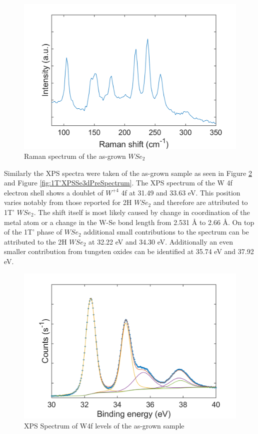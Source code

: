 \begin{figure}[!h]
	\begin{center}
		\includegraphics[scale=0.3]{1T'/RamanSpectrumPre.png}
		\caption{Raman spectrum of the as-grown $WSe_2$}
		\label{fig:1T'RamanSpectrumPre}
	\end{center}
\end{figure}

Similarly the XPS spectra were taken of the as-grown sample as seen in Figure \ref{fig:1T'XPSW4fPreSpectrum} and Figure \ref{fig:1T'XPSSe3dPreSpectrum}. The XPS spectrum of the W 4f electron shell shows a doublet of $W^{+4}$ 4f at 31.49 and 33.63 eV. This position varies notably from those reported for 2H $WSe_2$ and therefore are attributed to 1T' $WSe_2$. The shift itself is most likely caused by change in coordination of the metal atom or a change in the W-Se bond length from 2.531 \r{A} to 2.66 \r{A}. On top of the 1T' phase of $WSe_2$ additional small contributions to the spectrum can be attributed to the 2H $WSe_2$ at 32.22 eV and 34.30 eV. Additionally an even smaller contribution from tungsten oxides can be identified at 35.74 eV and 37.92 eV.

\begin{figure}[!h]
	\begin{center}
		\includegraphics[scale=0.3]{1T'/XPSW4fPre.png}
		\caption{XPS Spectrum of W4f levels of the as-grown sample}
		\label{fig:1T'XPSW4fPreSpectrum}
	\end{center}
\end{figure}

